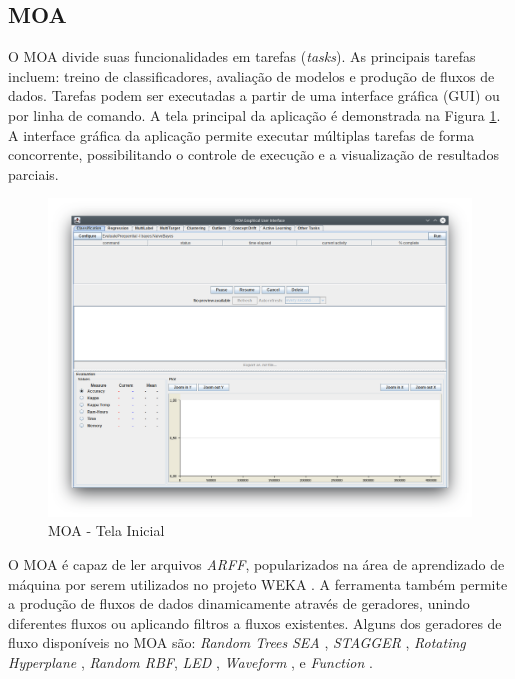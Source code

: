 \documentclass[qual, classic, a4paper]{ufbathesis}
\begin{document}
\subsection{MOA}

O MOA divide suas funcionalidades em tarefas (\textit{tasks}).
As principais tarefas incluem:
treino de classificadores,
avaliação de modelos e 
produção de fluxos de dados.
Tarefas podem ser executadas a partir de uma interface gráfica (GUI) ou por linha de comando.
A tela principal da aplicação é demonstrada na Figura \ref{fig:moa}.
A interface gráfica da aplicação permite executar múltiplas tarefas de forma concorrente, 
possibilitando o controle de execução e a visualização de resultados parciais.

\begin{figure}[!ht]
\begin{center}
    \includegraphics[scale=0.5]{imagens/moa.png}
    \caption{MOA - Tela Inicial}
    \label{fig:moa}
\end{center}
\end{figure}

O MOA é capaz de ler arquivos \textit{ARFF}, popularizados na área de aprendizado de máquina por serem utilizados no projeto WEKA \cite{Hall:2009:WDM:1656274.1656278}.
A ferramenta também permite a produção de fluxos de dados dinamicamente através de geradores, unindo diferentes fluxos ou aplicando filtros a fluxos existentes.
Alguns dos geradores de fluxo disponíveis no MOA são:
\textit{Random Trees} \cite{Domingos:2000:MHD:347090.347107}
\textit{SEA} \cite{Street:2001:SEA:502512.502568}, 
\textit{STAGGER} \cite{Schlimmer1986}, 
\textit{Rotating Hyperplane} \cite{Wang:2003:MCD:956750.956778},
\textit{Random RBF}, 
\textit{LED} \cite{Gama:2003:ADT:956750.956813}, 
\textit{Waveform} \cite{Gama:2003:ADT:956750.956813}, 
 e \textit{Function} \cite{Jin:2003:EDT:956750.956821}.
\end{document}
